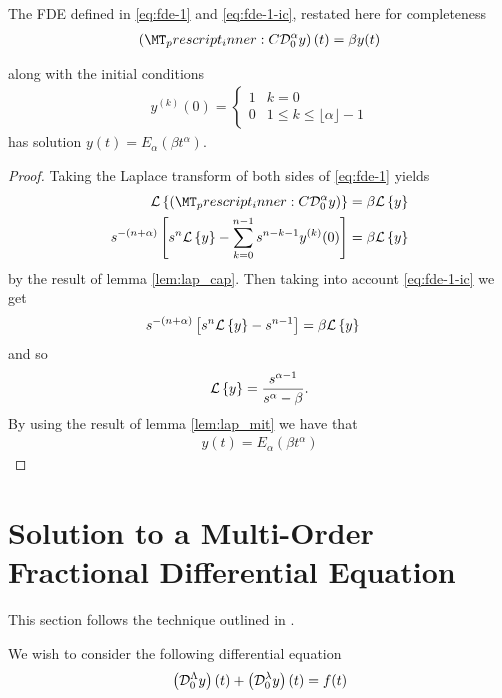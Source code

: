 \documentclass{unswmaths}
\begin{document}
\begin{lemma}
	The FDE defined in \eqref{eq:fde-1} and \eqref{eq:fde-1-ic}, restated here for completeness 
	\begin{align*}
		\left( \prescript{C}{}{\mathcal{D}_0^\alpha}y \right)(t) = \beta y(t) 
	\end{align*}

	along with the initial conditions 
	\begin{align*}
		y^{(k)}(0) = 
		\begin{cases}
			1 & k = 0 \\
			0 & 1 \leq k \leq \lfloor \alpha \rfloor - 1  
		\end{cases}
	\end{align*}
	has solution $ y(t) = E_\alpha \left( \beta t^\alpha \right) $.
\end{lemma}
\begin{proof}
	Taking the Laplace transform of both sides of \eqref{eq:fde-1} yields
	\begin{align*}
		\laplace{\capder{0}{\alpha}{y}} &= \beta \laplace{y} \\
		s^{-(n+\alpha)} \left[s^n \laplace{y} - \sum_{k=0}^{n-1} s^{n-k-1} y^{(k)}(0) \right] &= \beta \laplace{y}
	\end{align*}
	by the result of lemma \ref{lem:lap_cap}. 
	Then taking into account \eqref{eq:fde-1-ic} we get
	\begin{align*}
		s^{-(n+\alpha)} \left[s^n \mathcal{L} \left\{ y \right\} - s^{n-1}\right] &= \beta \mathcal{L} \left\{ y \right\}
	\end{align*}
	and so 
	\begin{align*}
		\mathcal{L} \left\{ y \right\} = \frac{s^{\alpha-1}}{s^\alpha - \beta}.
	\end{align*}
	By using the result of lemma \ref{lem:lap_mit} we have that 
	\begin{align*}
		y(t) = E_\alpha(\beta t^\alpha)
	\end{align*}
\end{proof}

\section*{Solution to a Multi-Order Fractional Differential Equation}

This section follows the technique outlined in \cite{Podlubny1999}.

We wish to consider the following differential equation
\begin{align}
	\label{eq:fde-multi-order}
	\left( \mathcal{D}_{0}^{\Lambda} y \right)(t) + \left( \mathcal{D}_{0}^{\lambda} y \right)(t) = f(t)
\end{align}
\end{document}

